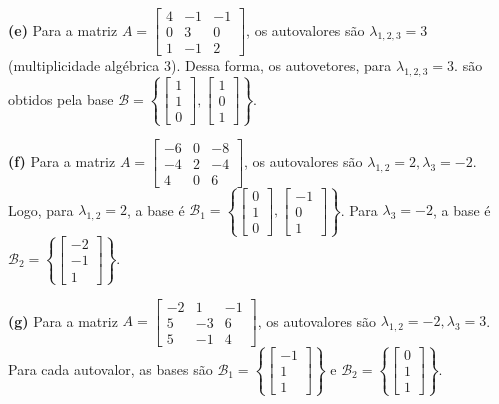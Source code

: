 \begin{resolution}
  \vspace{12pt}
  {\bf (e)} Para a matriz \( A = \begin{bmatrix} 4 & -1 & -1 \\ 0 & 3 & 0 \\ 1 & -1 & 2 \end{bmatrix} \), os autovalores são \( \lambda_{1, 2, 3} = 3 \) (multiplicidade algébrica 3). Dessa forma, os autovetores, para \( \lambda_{1, 2, 3} = 3 \). são obtidos pela base \( \mathcal{B} = \left\{ \begin{bmatrix} 1 \\ 1 \\ 0 \end{bmatrix}, \begin{bmatrix} 1 \\ 0 \\ 1 \end{bmatrix} \right\} \).


  \vspace{12pt}
  {\bf (f)} Para a matriz \( A = \begin{bmatrix} -6 & 0 & -8 \\ -4 & 2 & -4 \\ 4 & 0 & 6 \end{bmatrix} \), os autovalores são \( \lambda_{1,2} = 2, \lambda_3 = -2 \). Logo,
  para \( \lambda_{1,2} = 2 \), a base é \( \mathcal{B}_1 = \left\{ \begin{bmatrix} 0 \\ 1 \\ 0 \end{bmatrix}, \begin{bmatrix} -1 \\ 0 \\ 1 \end{bmatrix} \right\} \).
  Para \( \lambda_3 = -2 \), a base é \( \mathcal{B}_2 = \left\{ \begin{bmatrix} -2 \\ -1 \\ 1 \end{bmatrix} \right\} \).

  \vspace{12pt}
  {\bf (g)} Para a matriz \( A = \begin{bmatrix} -2 & 1 & -1 \\ 5 & -3 & 6 \\ 5 & -1 & 4 \end{bmatrix} \), os autovalores são \( \lambda_{1,2} = -2, \lambda_3 = 3\).  Para cada autovalor, as bases são \( \mathcal{B}_1 = \left\{ \begin{bmatrix} -1 \\ 1 \\ 1 \end{bmatrix} \right\} \) e \( \mathcal{B}_2 = \left\{ \begin{bmatrix} 0 \\ 1 \\ 1 \end{bmatrix} \right\} \).


\end{resolution}
